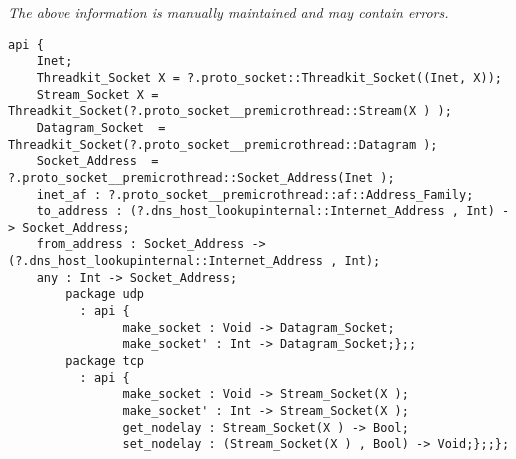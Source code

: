 \label{api:Internet\_Socket}

{\tiny \it The above information is manually maintained and may contain errors.}
\begin{verbatim}
api {
    Inet;
    Threadkit_Socket X = ?.proto_socket::Threadkit_Socket((Inet, X));
    Stream_Socket X = Threadkit_Socket(?.proto_socket__premicrothread::Stream(X ) );
    Datagram_Socket  = Threadkit_Socket(?.proto_socket__premicrothread::Datagram );
    Socket_Address  = ?.proto_socket__premicrothread::Socket_Address(Inet );
    inet_af : ?.proto_socket__premicrothread::af::Address_Family;
    to_address : (?.dns_host_lookupinternal::Internet_Address , Int) -> Socket_Address;
    from_address : Socket_Address -> (?.dns_host_lookupinternal::Internet_Address , Int);
    any : Int -> Socket_Address;
        package udp
          : api {
                make_socket : Void -> Datagram_Socket;
                make_socket' : Int -> Datagram_Socket;};;
        package tcp
          : api {
                make_socket : Void -> Stream_Socket(X );
                make_socket' : Int -> Stream_Socket(X );
                get_nodelay : Stream_Socket(X ) -> Bool;
                set_nodelay : (Stream_Socket(X ) , Bool) -> Void;};;};
\end{verbatim}
